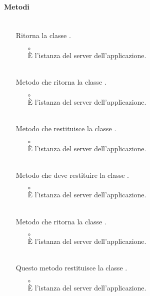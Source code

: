 \paragraph*{Metodi}
\begin{itemize}
\item[]  \\ Ritorna la classe .
\begin{itemize}\addtolength{\itemsep}{-0.5\baselineskip}
\item[$\circ$]  \\ È l'istanza del server dell'applicazione.
\end{itemize}
\item[]  \\ Metodo che ritorna la classe .
\begin{itemize}\addtolength{\itemsep}{-0.5\baselineskip}
\item[$\circ$]  \\ È l'istanza del server dell'applicazione.
\end{itemize}
\item[]  \\ Metodo che restituisce la classe .
\begin{itemize}\addtolength{\itemsep}{-0.5\baselineskip}
\item[$\circ$]  \\ È l'istanza del server dell'applicazione.
\end{itemize}
\item[]  \\ Metodo che deve restituire la classe .
\begin{itemize}\addtolength{\itemsep}{-0.5\baselineskip}
\item[$\circ$]  \\ È l'istanza del server dell'applicazione.
\end{itemize}
\item[]  \\ Metodo che ritorna la classe .
\begin{itemize}\addtolength{\itemsep}{-0.5\baselineskip}
\item[$\circ$]  \\ È l'istanza del server dell'applicazione.
\end{itemize}
\item[]  \\ Questo metodo restituisce la classe .
\begin{itemize}\addtolength{\itemsep}{-0.5\baselineskip}
\item[$\circ$]  \\ È l'istanza del server dell'applicazione.
\end{itemize}
\end{itemize}

